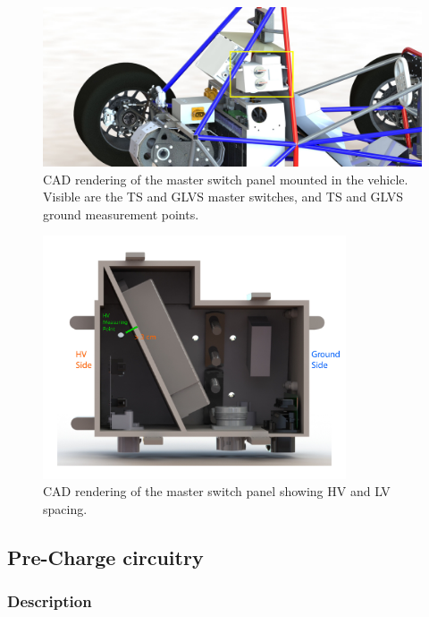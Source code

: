 \documentclass{article}
\begin{document}
\begin{figure}[H]
\centering
\includegraphics[width=\textwidth]{MSP_mount_angle.jpg}
\caption{CAD rendering of the master switch panel mounted in the vehicle. Visible are the TS and GLVS master switches, and TS and GLVS ground measurement points.}
\label{fig:master_switch_panel}
\end{figure}

\begin{figure}[H]
\centering
\includegraphics[width=0.8\textwidth]{MSP_HV_LV_spacing.jpg}
\caption{CAD rendering of the master switch panel showing HV and LV spacing.}
\label{fig:msp_spacing}
\end{figure} 

\subsection{Pre-Charge circuitry}\label{pre_charge_circuitry}
\subsubsection{Description}
\end{document}
